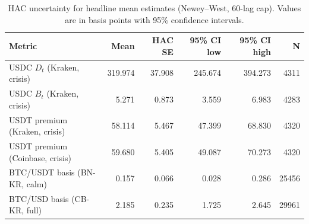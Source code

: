 \begin{table}[H]
\caption{HAC uncertainty for headline mean estimates (Newey--West, 60-lag cap). Values are in basis points with 95\% confidence intervals.}
\label{tab:hac_headline}
\footnotesize
\setlength{\tabcolsep}{4pt}
\begin{tabularx}{\textwidth}{>{\raggedright\arraybackslash}Xrrrrr}
\toprule
Metric & Mean & HAC SE & 95\% CI low & 95\% CI high & N \\
\midrule
USDC $D_t$ (Kraken, crisis) & 319.974 & 37.908 & 245.674 & 394.273 & 4311 \\
USDC $B_t$ (Kraken, crisis) & 5.271 & 0.873 & 3.559 & 6.983 & 4283 \\
USDT premium (Kraken, crisis) & 58.114 & 5.467 & 47.399 & 68.830 & 4320 \\
USDT premium (Coinbase, crisis) & 59.680 & 5.405 & 49.087 & 70.273 & 4320 \\
BTC/USDT basis (BN-KR, calm) & 0.157 & 0.066 & 0.028 & 0.286 & 25456 \\
BTC/USD basis (CB-KR, full) & 2.185 & 0.235 & 1.725 & 2.645 & 29961 \\
\bottomrule
\end{tabularx}
\end{table}
